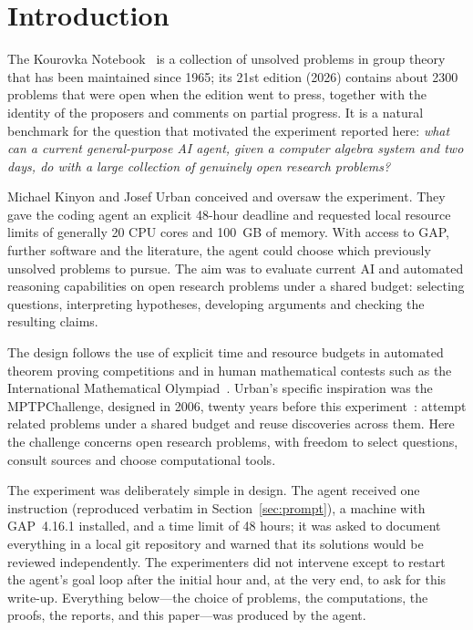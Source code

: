 \section{Introduction}\label{sec:intro}

The Kourovka Notebook~\cite{kourovka} is a collection of unsolved problems in group theory that has been maintained
since 1965; its 21st edition (2026) contains about 2300 problems that were open when the edition went to press,
together with the identity of the proposers and comments on partial progress. It is a natural benchmark for the
question that motivated the experiment reported here: \emph{what can a current general-purpose AI agent, given a
computer algebra system and two days, do with a large collection of genuinely open research problems?}

Michael Kinyon and Josef Urban conceived and oversaw the experiment. They gave the coding agent an explicit
48-hour deadline and requested local resource limits of generally 20 CPU cores and 100~GB of memory. With access to
GAP, further software and the literature, the agent could choose which previously unsolved problems to pursue. The
aim was to evaluate current AI and automated reasoning capabilities on open research problems under a shared
budget: selecting questions, interpreting hypotheses, developing arguments and checking the resulting claims.

The design follows the use of explicit time and resource budgets in automated theorem proving competitions and in
human mathematical contests such as the International Mathematical Olympiad~\cite{casc,imo}. Urban's specific
inspiration was the MPTPChallenge, designed in 2006, twenty years before this experiment~\cite{mptpchallenge}:
attempt related problems under a shared budget and reuse discoveries across them. Here the challenge concerns open
research problems, with freedom to select questions, consult sources and choose computational tools.

The experiment was deliberately simple in design. The agent received one instruction (reproduced verbatim in
Section~\ref{sec:prompt}), a machine with GAP~4.16.1 installed, and a time limit of 48 hours; it was asked to
document everything in a local git repository and warned that its solutions would be reviewed independently. The
experimenters did not intervene except to restart the agent's goal loop after the initial hour and, at the very
end, to ask for this write-up. Everything below---the choice of problems, the computations, the proofs, the
reports, and this paper---was produced by the agent.

